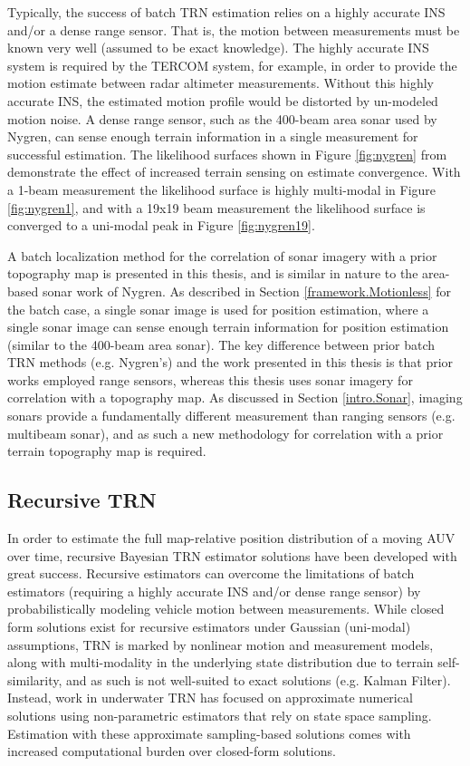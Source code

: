 Typically, the success of batch TRN estimation relies on a highly accurate INS and/or a dense range sensor.
That is, the motion between measurements must be known very well (assumed to be exact knowledge).
The highly accurate INS system is required by the TERCOM system, for example, in order to provide the motion estimate between radar altimeter measurements.
Without this highly accurate INS, the estimated motion profile would be distorted by un-modeled motion noise.
A dense range sensor, such as the 400-beam area sonar used by Nygren, can sense enough terrain information in a single measurement for successful estimation.
The likelihood surfaces shown in Figure \ref{fig:nygren} from \cite{Nygren2008} demonstrate the effect of increased terrain sensing on estimate convergence. 
With a 1-beam measurement the likelihood surface is highly multi-modal in Figure \ref{fig:nygren1}, and with a 19x19 beam measurement the likelihood surface is converged to a uni-modal peak in Figure \ref{fig:nygren19}.

A batch localization method for the correlation of sonar imagery with a prior topography map is presented in this thesis, and is similar in nature to the area-based sonar work of Nygren.
As described in Section \ref{framework.Motionless} for the batch case, a single sonar image is used for position estimation, where a single sonar image can sense enough terrain information for position estimation (similar to the 400-beam area sonar).
The key difference between prior batch TRN methods (e.g. Nygren's) and the work presented in this thesis is that prior works employed range sensors, whereas this thesis uses sonar imagery for correlation with a topography map.
As discussed in Section \ref{intro.Sonar}, imaging sonars provide a fundamentally different measurement than ranging sensors (e.g. multibeam sonar), and as such a new methodology for correlation with a prior terrain topography map is required.

\subsection{Recursive TRN}
\label{related.TRN.Recursive}

In order to estimate the full map-relative position distribution of a moving AUV over time, recursive Bayesian TRN estimator solutions have been developed with great success.
Recursive estimators can overcome the limitations of batch estimators (requiring a highly accurate INS and/or dense range sensor) by probabilistically modeling vehicle motion between measurements.
While closed form solutions exist for recursive estimators under Gaussian (uni-modal) assumptions, TRN is marked by nonlinear motion and measurement models, along with multi-modality in the underlying state distribution due to terrain self-similarity, and as such is not well-suited to exact solutions (e.g. Kalman Filter).
Instead, work in underwater TRN has focused on approximate numerical solutions using non-parametric estimators that rely on state space sampling.
Estimation with these approximate sampling-based solutions comes with increased computational burden over closed-form solutions.

